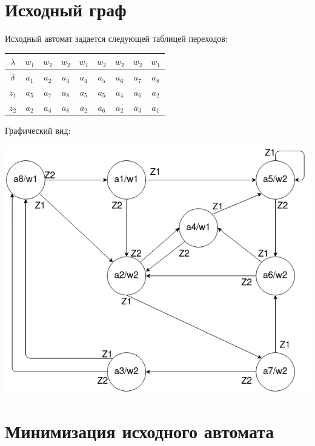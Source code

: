 \documentclass[12pt, a4paper]{article}
\begin{document}
\section*{Исходный граф}

Исходный автомат задается следующей таблицей переходов:

\begin{center}
\begin{tabular}{| c | c | c | c | c | c | c | c | c |}
  \hline
  $\lambda$ & $w_1$ & $w_2$ & $w_2$ & $w_1$ & $w_2$ & $w_2$ & $w_2$ & $w_1$\\
  \hline
  $\delta$ & $a_1$ & $a_2$ & $a_3$ & $a_4$ & $a_5$ & $a_6$ & $a_7$ & $a_8$\\
  \hline
  $z_1$ & $a_5$ & $a_7$ & $a_8$ & $a_5$ & $a_5$ & $a_4$ & $a_6$ & $a_2$\\
  \hline
  $z_2$ & $a_2$ & $a_4$ & $a_8$ & $a_2$ & $a_6$ & $a_2$ & $a_3$ & $a_1$\\
  \hline
\end{tabular}
\end{center}

Графический вид:

\begin{center}
  \includegraphics[scale=0.4]{ta2_1}
\end{center}

\section*{Минимизация исходного автомата}
\end{document}
